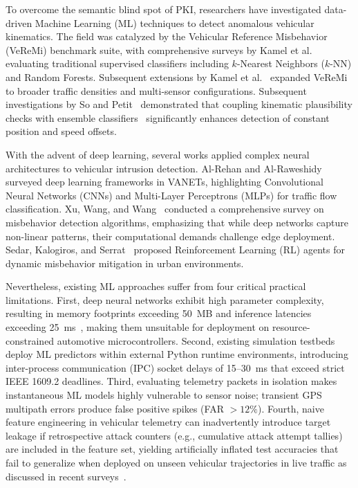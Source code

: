 \documentclass[conference]{IEEEtran}
\begin{document}
To overcome the semantic blind spot of PKI, researchers have investigated data-driven Machine Learning (ML) techniques to detect anomalous vehicular kinematics. The field was catalyzed by the Vehicular Reference Misbehavior (VeReMi) benchmark suite, with comprehensive surveys by Kamel et al.~\cite{veremi} evaluating traditional supervised classifiers including $k$-Nearest Neighbors ($k$-NN) and Random Forests. Subsequent extensions by Kamel et al.~\cite{kamel2020veremi} expanded VeReMi to broader traffic densities and multi-sensor configurations. Subsequent investigations by So and Petit~\cite{so2018verifying} demonstrated that coupling kinematic plausibility checks with ensemble classifiers~\cite{dietterich2000ensemble} significantly enhances detection of constant position and speed offsets.

With the advent of deep learning, several works applied complex neural architectures to vehicular intrusion detection. Al-Rehan and Al-Raweshidy~\cite{alrehan2019machine} surveyed deep learning frameworks in VANETs, highlighting Convolutional Neural Networks (CNNs) and Multi-Layer Perceptrons (MLPs) for traffic flow classification. Xu, Wang, and Wang~\cite{xu2022misbehavior} conducted a comprehensive survey on misbehavior detection algorithms, emphasizing that while deep networks capture non-linear patterns, their computational demands challenge edge deployment. Sedar, Kalogiros, and Serrat~\cite{sedar2020reinforcement} proposed Reinforcement Learning (RL) agents for dynamic misbehavior mitigation in urban environments. 

Nevertheless, existing ML approaches suffer from four critical practical limitations. First, deep neural networks exhibit high parameter complexity, resulting in memory footprints exceeding 50~MB and inference latencies exceeding 25~ms~\cite{alrehan2019machine}, making them unsuitable for deployment on resource-constrained automotive microcontrollers. Second, existing simulation testbeds deploy ML predictors within external Python runtime environments, introducing inter-process communication (IPC) socket delays of 15--30~ms that exceed strict IEEE 1609.2 deadlines. Third, evaluating telemetry packets in isolation makes instantaneous ML models highly vulnerable to sensor noise; transient GPS multipath errors produce false positive spikes (FAR $> 12\%$). Fourth, naive feature engineering in vehicular telemetry can inadvertently introduce target leakage if retrospective attack counters (e.g., cumulative attack attempt tallies) are included in the feature set, yielding artificially inflated test accuracies that fail to generalize when deployed on unseen vehicular trajectories in live traffic as discussed in recent surveys~\cite{xu2022misbehavior}.
\end{document}
